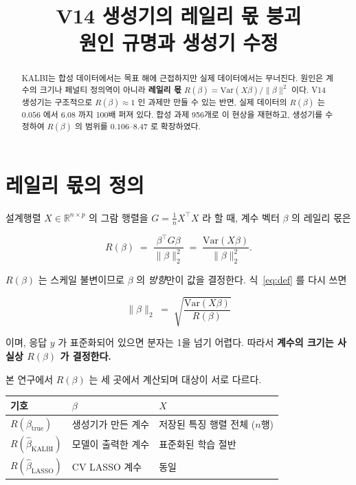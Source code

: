 \documentclass[11pt]{article}
\title{V14 생성기의 레일리 몫 붕괴\\[2mm]
\large 원인 규명과 생성기 수정}
\author{}
\date{}
\newcommand{\Rq}{R(\beta)}
\newcommand{\bhat}{\hat{\beta}}
\begin{document}
\maketitle

\begin{abstract}
KALBI는 합성 데이터에서는 목표 해에 근접하지만 실제 데이터에서는 무너진다.
원인은 계수의 크기나 페널티 정의역이 아니라 \textbf{레일리 몫}
$\Rq = \mathrm{Var}(X\beta)/\|\beta\|^2$ 이다.
V14 생성기는 구조적으로 $\Rq \approx 1$ 인 과제만 만들 수 있는 반면,
실제 데이터의 $\Rq$ 는 $0.056$ 에서 $6.08$ 까지 100배 퍼져 있다.
합성 과제 956개로 이 현상을 재현하고, 생성기를 수정하여
$\Rq$ 의 범위를 $0.106$--$8.47$ 로 확장하였다.
\end{abstract}

\section{레일리 몫의 정의}

설계행렬 $X \in \mathbb{R}^{n \times p}$ 의 그람 행렬을
$G = \frac{1}{n} X^\top X$ 라 할 때, 계수 벡터 $\beta$ 의 레일리 몫은

\begin{equation}
\Rq \;=\; \frac{\beta^\top G \beta}{\|\beta\|_2^2}
      \;=\; \frac{\mathrm{Var}(X\beta)}{\|\beta\|_2^2}.
\label{eq:def}
\end{equation}

$\Rq$ 는 스케일 불변이므로 $\beta$ 의 \emph{방향}만이 값을 결정한다.
식~\eqref{eq:def} 를 다시 쓰면

\begin{equation}
\|\beta\|_2 \;=\; \sqrt{\frac{\mathrm{Var}(X\beta)}{\Rq}}
\label{eq:norm}
\end{equation}

이며, 응답 $y$ 가 표준화되어 있으면 분자는 1을 넘기 어렵다.
따라서 \textbf{계수의 크기는 사실상 $\Rq$ 가 결정한다.}

본 연구에서 $\Rq$ 는 세 곳에서 계산되며 대상이 서로 다르다.

\begin{table}[h]
\centering
\begin{tabular}{@{}lll@{}}
\toprule
기호 & $\beta$ & $X$ \\
\midrule
$R(\beta_{\mathrm{true}})$ & 생성기가 만든 계수 & 저장된 특징 행렬 전체 ($n$행) \\
$R(\bhat_{\mathrm{KALBI}})$ & 모델이 출력한 계수 & 표준화된 학습 절반 \\
$R(\bhat_{\mathrm{LASSO}})$ & CV LASSO 계수 & 동일 \\
\bottomrule
\end{tabular}
\end{table}
\end{document}
